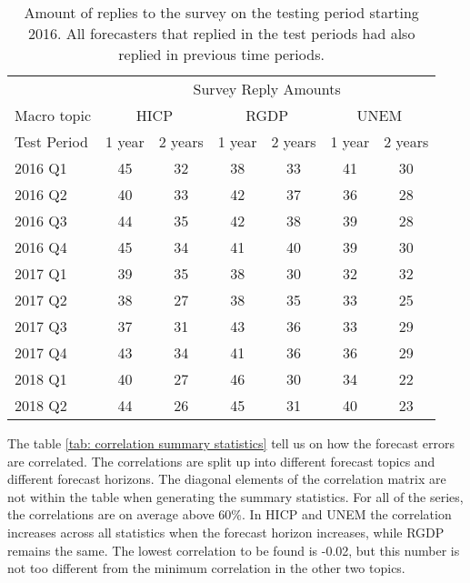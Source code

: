 \documentclass[11pt]{article}
\begin{document}
\begin{table}[!h]
	\centering
	\caption{Amount of replies to the survey on the testing period starting 2016. All forecasters that replied in the test periods had also replied in previous time periods.}
	\label{tab: amount per test period}
	\begin{tabular}{lcccccc}%
		\hline
		&\multicolumn{6}{c}{Survey Reply Amounts}\\
		\cmidrule(lr){2-7}
		Macro topic & \multicolumn{2}{c}{HICP} & \multicolumn{2}{c}{RGDP} & \multicolumn{2}{c}{UNEM} \\
		\cmidrule(lr){2-3} \cmidrule(lr){4-5}\cmidrule(lr){6-7}
		Test Period     & 1 year & 2 years & 1 year & 2 years & 1 year & 2 years \\ 
		\hline
2016 Q1      & 45    & 32    & 38    & 33    & 41    & 30    \\
2016 Q2      & 40    & 33    & 42    & 37    & 36    & 28    \\
2016 Q3      & 44    & 35    & 42    & 38    & 39    & 28    \\
2016 Q4      & 45    & 34    & 41    & 40    & 39    & 30    \\
2017 Q1      & 39    & 35    & 38    & 30    & 32    & 32    \\
2017 Q2      & 38    & 27    & 38    & 35    & 33    & 25    \\
2017 Q3      & 37    & 31    & 43    & 36    & 33    & 29    \\
2017 Q4      & 43    & 34    & 41    & 36    & 36    & 29    \\
2018 Q1      & 40    & 27    & 46    & 30    & 34    & 22    \\
2018 Q2      & 44    & 26    & 45    & 31    & 40    & 23    \\ 
		\hline
	\end{tabular}
\end{table}

The table \ref{tab: correlation summary statistics} tell us on how the
forecast errors are correlated. The correlations are split up into
different forecast topics and different forecast horizons. The diagonal
elements of the correlation matrix are not within the table when
generating the summary statistics. For all of the series, the
correlations are on average above 60\%. In HICP and UNEM the correlation
increases across all statistics when the forecast horizon increases,
while RGDP remains the same. The lowest correlation to be found is
-0.02, but this number is not too different from the minimum correlation
in the other two topics.
\end{document}
